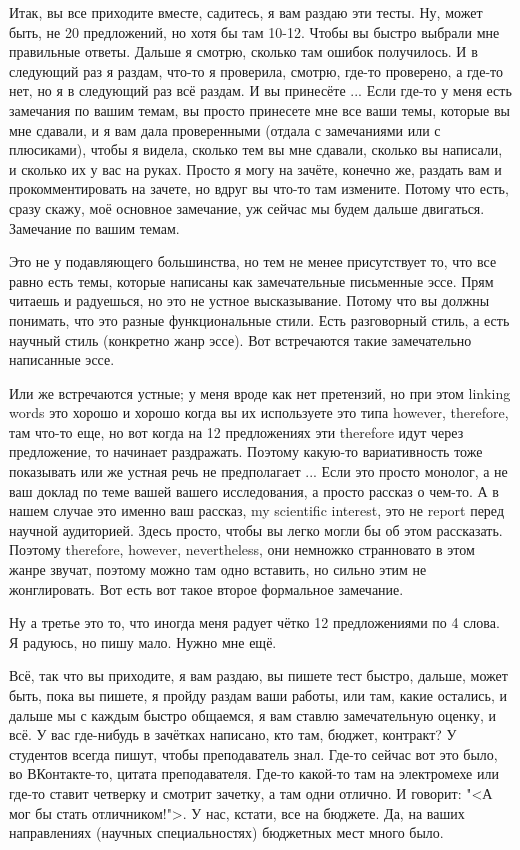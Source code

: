 \documentclass[main.tex]{subfiles}
\begin{document}
Итак, вы все приходите вместе, садитесь, я вам раздаю эти тесты.
Ну, может быть, не 20 предложений, но хотя бы там 10-12.
Чтобы вы быстро выбрали мне правильные ответы.
Дальше я смотрю, сколько там ошибок получилось.
И в следующий раз я раздам, что-то я проверила, смотрю, где-то проверено, а где-то нет, но я в следующий раз всё раздам.
И вы принесёте ...
Если где-то у меня есть замечания по вашим темам, вы просто принесете мне все ваши темы, которые вы мне сдавали, и я вам дала проверенными (отдала с замечаниями или с плюсиками), чтобы я видела, сколько тем вы мне сдавали, сколько вы написали, и сколько их у вас на руках.
Просто я могу на зачёте, конечно же, раздать вам и прокомментировать на зачете, но вдруг вы что-то там измените.
Потому что есть, сразу скажу, моё основное замечание, уж сейчас мы будем дальше двигаться.
Замечание по вашим темам.

Это не у подавляющего большинства, но тем не менее присутствует то, что все равно есть темы, которые написаны как замечательные письменные эссе.
Прям читаешь и радуешься, но это не устное высказывание.
Потому что вы должны понимать, что это разные функциональные стили.
Есть разговорный стиль, а есть научный стиль (конкретно жанр эссе).
Вот встречаются такие замечательно написанные эссе.

Или же встречаются устные; у меня вроде как нет претензий, но при этом linking words это хорошо и хорошо когда вы их используете это типа however, therefore, там что-то еще, но вот когда на 12 предложениях эти therefore идут через предложение, то начинает раздражать.
Поэтому какую-то вариативность тоже показывать или же устная речь не предполагает ...
Если это просто монолог, а не ваш доклад по теме вашей вашего исследования, а просто рассказ о чем-то.
А в нашем случае это именно ваш рассказ, my scientific interest, это не report перед научной аудиторией.
Здесь просто, чтобы вы легко могли бы об этом рассказать.
Поэтому therefore, however, nevertheless, они немножко странновато в этом жанре звучат, поэтому можно там одно вставить, но сильно этим не жонглировать.
Вот есть вот такое второе формальное замечание.

Ну а третье это то, что иногда меня радует чётко 12 предложениями по 4 слова.
Я радуюсь, но пишу мало.
Нужно мне ещё.

Всё, так что вы приходите, я вам раздаю, вы пишете тест быстро, дальше, может быть, пока вы пишете, я пройду раздам ваши работы, или там, какие остались, и дальше мы с каждым быстро общаемся, я вам ставлю замечательную оценку, и всё.
У вас где-нибудь в зачётках написано, кто там, бюджет, контракт?
У студентов всегда пишут, чтобы преподаватель знал.
Где-то сейчас вот это было, во ВКонтакте-то, цитата преподавателя.
Где-то какой-то там на электромехе или где-то ставит четверку и смотрит зачетку, а там одни отлично.
И говорит: "<А мог бы стать отличником!">.
У нас, кстати, все на бюджете.
Да, на ваших направлениях (научных специальностях) бюджетных мест много было.
\end{document}
